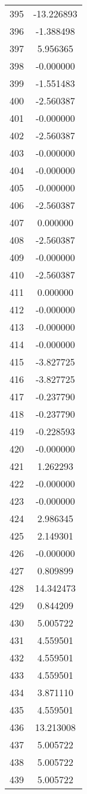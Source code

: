 \documentclass[12pt]{article}
\begin{document}
\begin{longtable}{@{}cc@{}}
395 & -13.226893 \\
396 & -1.388498 \\
397 & 5.956365 \\
398 & -0.000000 \\
399 & -1.551483 \\
400 & -2.560387 \\
401 & -0.000000 \\
402 & -2.560387 \\
403 & -0.000000 \\
404 & -0.000000 \\
405 & -0.000000 \\
406 & -2.560387 \\
407 & 0.000000 \\
408 & -2.560387 \\
409 & -0.000000 \\
410 & -2.560387 \\
411 & 0.000000 \\
412 & -0.000000 \\
413 & -0.000000 \\
414 & -0.000000 \\
415 & -3.827725 \\
416 & -3.827725 \\
417 & -0.237790 \\
418 & -0.237790 \\
419 & -0.228593 \\
420 & -0.000000 \\
421 & 1.262293 \\
422 & -0.000000 \\
423 & -0.000000 \\
424 & 2.986345 \\
425 & 2.149301 \\
426 & -0.000000 \\
427 & 0.809899 \\
428 & 14.342473 \\
429 & 0.844209 \\
430 & 5.005722 \\
431 & 4.559501 \\
432 & 4.559501 \\
433 & 4.559501 \\
434 & 3.871110 \\
435 & 4.559501 \\
436 & 13.213008 \\
437 & 5.005722 \\
438 & 5.005722 \\
439 & 5.005722 \\

\end{longtable}
\end{document}
